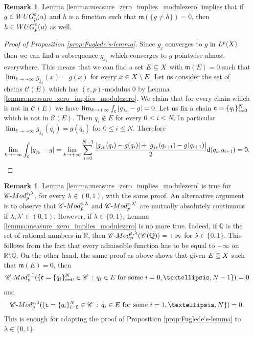 \documentclass[12pt]{amsart}
\newcommand{\Q}{\mathbb{Q}}
\newcommand{\R}{\mathbb{R}}
\newcommand{\sfd}{{\sf d}}
\newcommand{\X}{{\rm X}}
\newcommand{\mm}{\mathfrak m}
\theoremstyle{definition}
\newtheorem{remark}[theorem]{Remark}
\newcommand{\cModepsilon}[2]{{\mathscr C}\text{-}{\rm Mod}_{#2}^{#1}}
\newcommand{\sfc}{{\sf c}}
\newcommand{\Chain}[1]{\mathscr{C}^{#1}}
\newcommand{\WUG}[2]{{\rm WUG}_{#1}^{#2}}
\begin{document}
\begin{remark}
\label{rmk:WUG_up_to_measure_zero}
    Lemma \ref{lemma:measure_zero_implies_modulezero} implies that if $g \in \WUG{p}{\varepsilon}(u)$ and $h$ is a function such that $\mm(\{g \neq h\})=0$, then $h \in \WUG{p}{\varepsilon}(u)$ as well.
\end{remark}

\begin{proof}[Proof of Proposition \ref{prop:Fuglede's-lemma}]
Since $g_j$ converges to $g$ in $L^p(\X)$ then we can find a subsequence $g_{j_k}$ which converges to $g$ pointwise almost everywhere. This means that we can find a set $E \subseteq \X$ with $\mm(E) = 0$ such that $\lim_{k\to +\infty} g_{j_k}(x) = g(x)$ for every $x\in \X \setminus E$. Let us consider the set of chains $\Chain{}(E)$ which has $(\varepsilon, p)$-modulus $0$ by Lemma \ref{lemma:measure_zero_implies_modulezero}. We claim that for every chain which is not in $\Chain{}(E)$ we have $\lim_{k\to +\infty} \int_\sfc \vert g_{j_k} - g \vert = 0$. 
Let us fix a chain $\sfc = \{q_i\}_{i=0}^N$ which is not in $\Chain{}(E)$. 
Then $q_i \notin E$ for every $0\le i \le N$. In particular $\lim_{k\to +\infty}g_{j_k}(q_i) = g(q_i)$ for $0\le i \le N$. Therefore
$$\lim_{k\to +\infty} \int_\sfc \vert g_{j_k} - g \vert = \lim_{k\to +\infty}  \sum_{i=0}^{N-1} \frac{\vert g_{j_k}(q_i) - g(q_i) \vert + \vert g_{j_k}(q_{i+1}) - g(q_{i+1})\vert}{2}\sfd(q_i,q_{i+1}) = 0.$$
\end{proof}
%
\begin{remark}
    \label{rmk:chain-modulus-of-measure-zero-sets}
    Lemma \ref{lemma:measure_zero_implies_modulezero} is true for $\cModepsilon{\varepsilon,\lambda}{p}$, for every $\lambda\in(0,1)$, with the same proof. An alternative argument is to observe that $\cModepsilon{\varepsilon,\lambda}{p}$ and $\cModepsilon{\varepsilon,\lambda'}{p}$ are mutually absolutely continuous if $\lambda,\lambda'\in (0,1)$. 
    However, if $\lambda \in \{0,1\}$, Lemma \ref{lemma:measure_zero_implies_modulezero} is no more true. Indeed, if $\Q$ is the set of rational numbers in $\R$, then $\cModepsilon{\varepsilon,\lambda}{p}(\Chain{}(\Q)) = +\infty$ for $\lambda \in \{0,1\}$. This follows from the fact that every admissible function has to be equal to $+\infty$ on $\R\setminus \Q$. On the other hand, the same proof as above shows that given $E\subseteq \X$ such that $\mm(E)=0$, then
    $$\cModepsilon{\varepsilon,1}{p}(\{ \sfc = \{q_i\}_{i=0}^N \in \Chain{}\, : \, q_i \in E \text{ for some } i=0, \ldots, N-1\}) = 0$$
    and
    $$\cModepsilon{\varepsilon,0}{p}(\{ \sfc = \{q_i\}_{i=0}^N \in \Chain{}\, : \, q_i \in E \text{ for some } i=1, \ldots, N\}) = 0.$$
    This is enough for adapting the proof of Proposition \ref{prop:Fuglede's-lemma} to $\lambda \in \{0,1\}$.
\end{remark}
\end{document}
